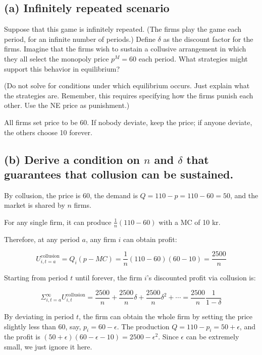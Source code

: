\documentclass{article}
\begin{document}
\subsection*{(a) Infinitely repeated scenario}

Suppose that this game is infinitely repeated. (The firms play the
game each period, for an infinite number of periods.) Define $\delta$  as the
discount factor for the firms. Imagine that the firms wish to sustain
a collusive arrangement in which they all select the monopoly price
$p^M = 60$ each period. What strategies might support this behavior in
equilibrium? 

\medskip 

(Do not solve for conditions under which equilibrium
occurs. Just explain what the strategies are. Remember, this requires
specifying how the firms punish each other. Use the NE
price as punishment.)

\bigskip

All firms set price to be 60. If nobody deviate, keep the price; if anyone deviate, the others choose 10 forever.

\subsection*{(b) Derive a condition on $n$ and $\delta$ that guarantees that collusion can be sustained.}

By collusion, the price is 60, the demand is $Q = 110 -p = 110- 60 =50$, and the
market is shared by $n$ firms.

\smallskip

For any single firm, it can produce $\frac{1}{n}(110-60)$ with a MC of 10 kr.

\smallskip

Therefore, at any period $a$, any firm $i$ can obtain profit:


$$U^{\text{collusion}}_{i,t=a} = Q_i (p-MC) = \frac{1}{n}(110-60) (60-10) = \frac {2500}{n} $$

Starting from period $t$ until forever, the firm $i$'s discounted profit via collusion is:

$$\Sigma^{\infty}_{i,t=a} U^{\text{collusion}}_{i,t}= \frac {2500}{n} + \frac {2500}{n} \delta + \frac {2500}{n}\delta^2 + \cdots = \frac {2500}{n} \frac{1}{1-\delta}$$


By deviating in period $t$, the firm can obtain the whole firm by setting the price slightly less than $60$, say, $p_i = 60 -\epsilon$. The production $Q = 110 - p_i = 50 + \epsilon$, and the profit is $(50 + \epsilon)(60 -\epsilon -10)=2500 - \epsilon^2$. Since $\epsilon$ can be extremely small, we just ignore it here.
\end{document}
